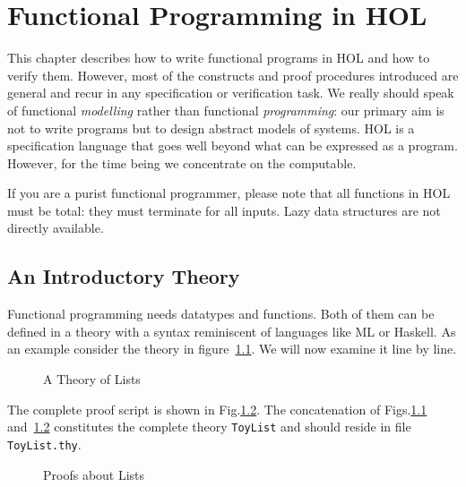 \chapter{Functional Programming in HOL}

This chapter describes how to write
functional programs in HOL and how to verify them.  However, 
most of the constructs and
proof procedures introduced are general and recur in any specification
or verification task.  We really should speak of functional
\emph{modelling} rather than functional \emph{programming}: 
our primary aim is not
to write programs but to design abstract models of systems.  HOL is
a specification language that goes well beyond what can be expressed as a
program. However, for the time being we concentrate on the computable.

If you are a purist functional programmer, please note that all functions
in HOL must be total:
they must terminate for all inputs.  Lazy data structures are not
directly available.

\section{An Introductory Theory}
\label{sec:intro-theory}

Functional programming needs datatypes and functions. Both of them can be
defined in a theory with a syntax reminiscent of languages like ML or
Haskell. As an example consider the theory in figure~\ref{fig:ToyList}.
We will now examine it line by line.

\begin{figure}[htbp]
\begin{ttbox}\makeatother
\end{ttbox}
\caption{A Theory of Lists}
\label{fig:ToyList}
\end{figure}

{\makeatother\medskip}

The complete proof script is shown in Fig.\ts\ref{fig:ToyList-proofs}. The
concatenation of Figs.\ts\ref{fig:ToyList} and~\ref{fig:ToyList-proofs}
constitutes the complete theory \texttt{ToyList} and should reside in file
\texttt{ToyList.thy}.

\begin{figure}[htbp]
\begin{ttbox}\makeatother
\end{ttbox}
\caption{Proofs about Lists}
\label{fig:ToyList-proofs}
\end{figure}


